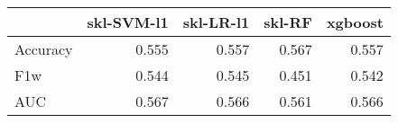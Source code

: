 \begin{tabular}{lrrrr}
\toprule
{} &  skl-SVM-l1 &  skl-LR-l1 &  skl-RF &  xgboost \\
\midrule
Accuracy &       0.555 &      0.557 &   0.567 &    0.557 \\
F1w      &       0.544 &      0.545 &   0.451 &    0.542 \\
AUC      &       0.567 &      0.566 &   0.561 &    0.566 \\
\bottomrule
\end{tabular}
